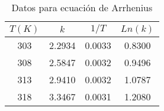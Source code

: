 \begin{table}[H]
    \centering
    \begin{tabular}{cccc}
        \hline
        
        $T(K)$ & $k$ & $1/T$    & $Ln(k)$ \\
        \hline
        303	& 2.2934 &	0.0033	& 0.8300  \\
        308	& 2.5847 &	0.0032	& 0.9496  \\
        313	& 2.9410 &	0.0032	& 1.0787  \\
        318	& 3.3467 &	0.0031	& 1.2080  \\

        \hline

    \end{tabular} 
    \caption{Datos para ecuación de Arrhenius}
    \label{tab:regresion_logaritmos}

\end{table}\\